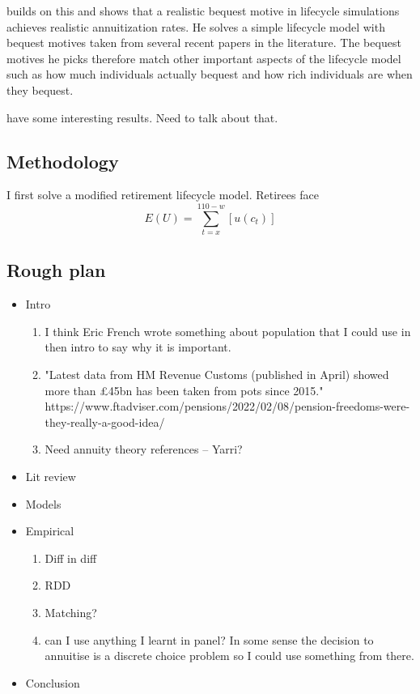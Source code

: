 \documentclass[12pt]{article}
\begin{document}
\cite{lockwood_red_2012} builds on this and shows that a realistic bequest motive in lifecycle simulations achieves
realistic annuitization rates. He solves a simple lifecycle model with bequest motives taken from several recent papers
in the literature. The bequest motives he picks therefore match other important aspects of the lifecycle model such
as how much individuals actually bequest and how rich individuals are when they bequest.

\cite{lockwood_aer_2018}

\cite{vidalmelia_lejarragagarcia_munich_2004} have some interesting results. Need to talk about that.

\subsection{Methodology}

I first solve a modified retirement lifecycle model. Retirees face
\begin{equation*}
      E(U) = \sum_{t = x}^{110 - w}[u(c_{t})]
\end{equation*}


\subsection{Rough plan}
\begin{itemize}
      \item Intro
            \begin{enumerate}
                  \item I think Eric French wrote something about population that I could use in then intro to say why it is important.
                  \item "Latest data from HM Revenue Customs (published in April) showed more than £45bn has been taken from pots since 2015."
                        https://www.ftadviser.com/pensions/2022/02/08/pension-freedoms-were-they-really-a-good-idea/

                  \item Need annuity theory references -- Yarri?
            \end{enumerate}
      \item Lit review
      \item Models
      \item Empirical
            \begin{enumerate}
                  \item Diff in diff
                  \item RDD
                  \item Matching?
                  \item can I use anything I learnt in panel?
                        In some sense the decision to annuitise is a discrete choice problem so I could use something from there.
            \end{enumerate}
      \item Conclusion
\end{itemize}




\end{document}
